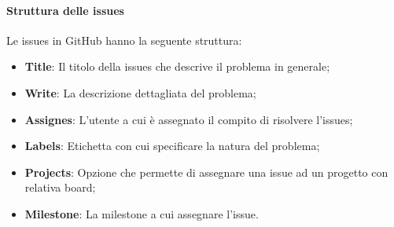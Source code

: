                              \paragraph{Struttura delle issues}
                                 Le issues in GitHub hanno la seguente struttura:
                                 \begin{itemize}
                                     \item \textbf{Title}: Il titolo della issues che descrive il problema in generale;
                                     \item \textbf{Write}: La descrizione dettagliata del problema;
                                     \item \textbf{Assignes}: L'utente a cui è assegnato il compito di risolvere l'issues;
                                     \item \textbf{Labels}: Etichetta con cui specificare la natura del problema;
                                     \item \textbf{Projects}: Opzione che permette di assegnare una issue ad un progetto con relativa board;
                                     \item \textbf{Milestone}: La milestone a cui assegnare l'issue. 
                                 \end{itemize}

                                 
                             
           
                         
                
                    
                     
                
            
    
     
            
            